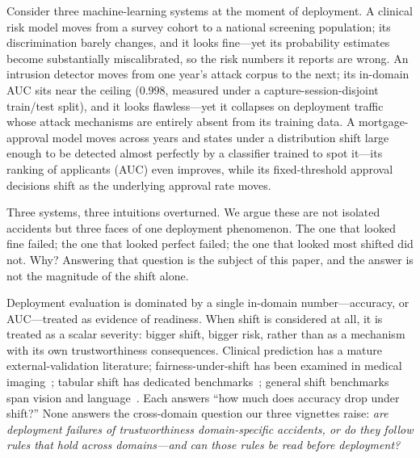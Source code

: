 \documentclass[11pt]{article}
\begin{document}
Consider three machine-learning systems at the moment of deployment. A clinical risk model moves
from a survey cohort to a national screening population; its discrimination barely changes, and it
looks fine---yet its probability estimates become substantially miscalibrated, so the risk numbers
it reports are wrong. An intrusion detector moves from one year's attack corpus to the next; its
in-domain AUC sits near the ceiling ($0.998$, measured under a capture-session-disjoint train/test
split), and it looks flawless---yet it collapses on deployment traffic whose attack mechanisms are
entirely absent from its training data. A mortgage-approval model moves across years and states
under a distribution shift large enough to be detected almost perfectly by a classifier trained to
spot it---its ranking of applicants (AUC) even improves, while its fixed-threshold approval
decisions shift as the underlying approval rate moves.

Three systems, three intuitions overturned. We argue these are not isolated accidents but three
faces of one deployment phenomenon. The one that looked fine failed; the one that looked perfect
failed; the one that looked most shifted did not. Why? Answering that question is the subject of
this paper, and the answer is not the magnitude of the shift alone.

Deployment evaluation is dominated by a single in-domain number---accuracy, or AUC---treated as
evidence of readiness. When shift is considered at all, it is treated as a scalar severity: bigger
shift, bigger risk, rather than as a mechanism with its own trustworthiness consequences. Clinical
prediction has a mature external-validation literature; fairness-under-shift has been examined in
medical imaging~\citep{schrouff2022diagnosing}; tabular shift has dedicated
benchmarks~\citep{gardner2023tableshift}; general shift benchmarks span vision and
language~\citep{koh2021wilds}. Each answers ``how much does accuracy drop under shift?'' None
answers the cross-domain question our three vignettes raise: \emph{are deployment failures of
trustworthiness domain-specific accidents, or do they follow rules that hold across
domains---and can those rules be read before deployment?}
\end{document}
